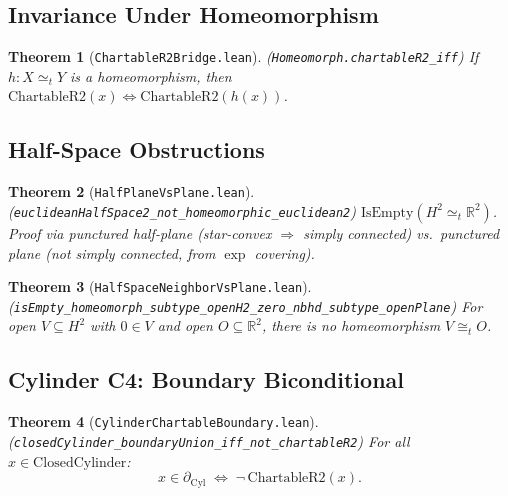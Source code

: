 \documentclass[11pt]{article}
\newtheorem{theorem}{Theorem}[section]
\newcommand{\leanref}[1]{\texttt{\small #1}}
\begin{document}
\subsection{Invariance Under Homeomorphism}

\begin{theorem}[\leanref{ChartableR2Bridge.lean}]
\label{thm:chartable-invar}
(\leanref{Homeomorph.chartableR2\_iff}) If $h : X \simeq_t Y$ is a homeomorphism, then $\mathrm{ChartableR2}(x) \iff \mathrm{ChartableR2}(h(x))$.
\end{theorem}


\subsection{Half-Space Obstructions}
\label{sec:halfspace}


\begin{theorem}[\leanref{HalfPlaneVsPlane.lean}]
\label{thm:halfplane}
(\leanref{euclideanHalfSpace2\_not\_homeomorphic\_euclidean2})
$\mathrm{IsEmpty}(H^2 \simeq_t \mathbb{R}^2)$.
Proof via punctured half-plane (star-convex $\Rightarrow$ simply connected) vs.\ punctured plane (not simply connected, from $\exp$ covering).
\end{theorem}

\begin{theorem}[\leanref{HalfSpaceNeighborVsPlane.lean}]
\label{thm:halfspace-local}
(\leanref{isEmpty\_homeomorph\_subtype\_openH2\_zero\_nbhd\_subtype\_openPlane})
For open $V \subseteq H^2$ with $0 \in V$ and open $O \subseteq \mathbb{R}^2$, there is no homeomorphism $V \cong_t O$.
\end{theorem}


\subsection{Cylinder C4: Boundary Biconditional}

\begin{theorem}[\leanref{CylinderChartableBoundary.lean}]
\label{thm:cylinder-c4}
(\leanref{closedCylinder\_boundaryUnion\_iff\_not\_chartableR2})
For all $x \in \mathrm{ClosedCylinder}$:
\[
  x \in \partial_{\mathrm{Cyl}} \;\iff\; \neg\,\mathrm{ChartableR2}(x).
\]
\end{theorem}
\end{document}
